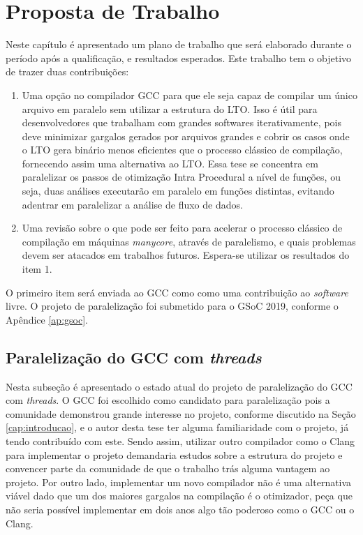 \chapter{Proposta de Trabalho}
\label{chap:proposta}

Neste capítulo é apresentado um plano de trabalho que será elaborado
durante o período após a qualificação, e resultados esperados.
Este trabalho tem o objetivo de trazer duas contribuições:
\begin{enumerate}
    \item Uma opção no compilador GCC para que ele seja
capaz de compilar um único arquivo em paralelo sem utilizar a
estrutura do LTO. Isso é útil para desenvolvedores que trabalham
com grandes softwares iterativamente, pois deve minimizar
gargalos gerados por arquivos grandes e cobrir os casos onde o LTO gera
binário menos eficientes que o processo clássico de compilação, fornecendo assim
uma alternativa ao LTO.
Essa tese se concentra em paralelizar os passos de otimização Intra Procedural
a nível de funções, ou seja, duas análises executarão em paralelo em funções
distintas, evitando adentrar em paralelizar a análise de fluxo de dados.

    \item Uma revisão sobre o que pode ser feito para acelerar o
processo clássico de compilação em máquinas \textit{manycore}, através
de paralelismo, e quais problemas devem ser atacados em trabalhos futuros.
Espera-se utilizar os resultados do item 1.
\end{enumerate}
O primeiro item será enviada ao GCC como como uma contribuição
ao \textit{software} livre. O projeto de paralelização foi submetido para o GSoC 2019,
conforme o Apêndice \ref{ap:gsoc}.


\section{Paralelização do GCC com \textit{threads}}

Nesta subseção é apresentado o estado atual do projeto de paralelização
do GCC com \textit{threads}. O GCC foi escolhido como candidato para
paralelização pois a comunidade demonstrou grande interesse no projeto,
conforme discutido na Seção \ref{cap:introducao}, e o autor desta tese ter alguma
familiaridade com o projeto, já tendo contribuído com este. Sendo assim,
utilizar outro compilador como o Clang para implementar o projeto demandaria
estudos sobre a estrutura do projeto e convencer parte da comunidade de que
o trabalho trás alguma vantagem ao projeto. Por outro lado, implementar um
novo compilador não é uma alternativa viável dado que um dos maiores gargalos
na compilação é o otimizador, peça que não seria possível implementar em
dois anos algo tão poderoso como o GCC ou o Clang.

